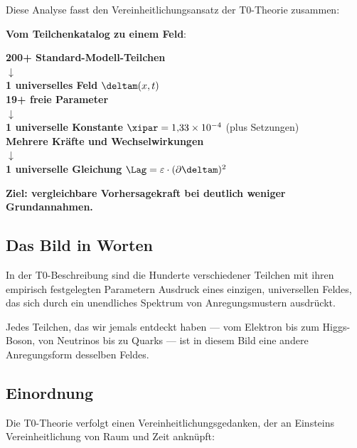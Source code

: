 	Diese Analyse fasst den Vereinheitlichungsansatz der T0-Theorie zusammen:
	
	\begin{tcolorbox}[colback=green!5!white,colframe=green!75!black,title=Der Vereinheitlichungsansatz]
		\textbf{Vom Teilchenkatalog zu einem Feld}:
		
		\begin{center}
			\textbf{200+ Standard-Modell-Teilchen} \\
			$\downarrow$ \\
			\textbf{1 universelles Feld} $\deltam(x,t)$ \\[1em]
			
			\textbf{19+ freie Parameter} \\
			$\downarrow$ \\
			\textbf{1 universelle Konstante} $\xipar = 1{,}33 \times 10^{-4}$ (plus Setzungen) \\[1em]
			
			\textbf{Mehrere Kräfte und Wechselwirkungen} \\
			$\downarrow$ \\
			\textbf{1 universelle Gleichung} $\Lag = \varepsilon \cdot (\partial \deltam)^2$
		\end{center}
		
		\textbf{Ziel: vergleichbare Vorhersagekraft bei deutlich weniger Grundannahmen.}
	\end{tcolorbox}
	
	\subsection{Das Bild in Worten}
	
	In der T0-Beschreibung sind die Hunderte verschiedener Teilchen mit ihren empirisch festgelegten Parametern Ausdruck eines einzigen, universellen Feldes, das sich durch ein unendliches Spektrum von Anregungsmustern ausdrückt.
	
	Jedes Teilchen, das wir jemals entdeckt haben --- vom Elektron bis zum Higgs-Boson, von Neutrinos bis zu Quarks --- ist in diesem Bild eine andere Anregungsform desselben Feldes.
	
	\subsection{Einordnung}
	
	Die T0-Theorie verfolgt einen Vereinheitlichungsgedanken, der an Einsteins Vereinheitlichung von Raum und Zeit anknüpft:
	
